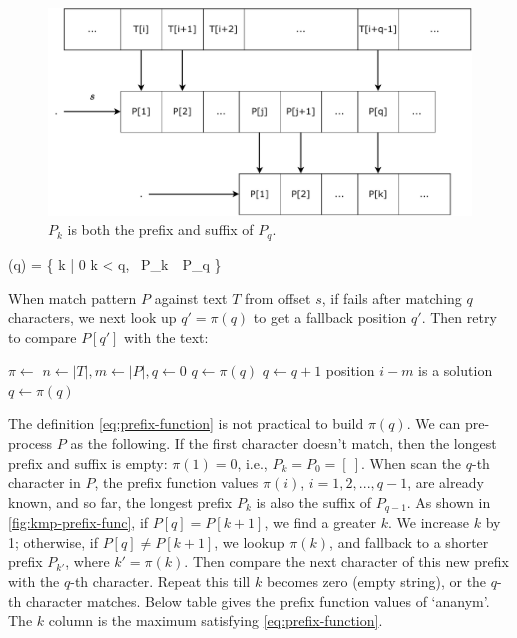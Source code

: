 \documentclass[b5paper]{article}
\begin{document}
\begin{figure}[htbp]
 \centering
 \includegraphics[scale=0.45]{img/kmp-fallback}
 \caption{$P_k$ is both the prefix and suffix of $P_q$.}
 \label{fig:kmp-fallback}
\end{figure}

\be
\pi(q) = \max \{ k | 0 \leq k < q, \ P_k\ \ P_q \}
\label{eq:prefix-function}
\ee

When match pattern $P$ against text $T$ from offset $s$, if fails after matching $q$ characters, we next look up $q' = \pi(q)$ to get a fallback position $q'$. Then retry to compare $P[q']$ with the text:

\begin{algorithmic}[1]
  \State $\pi \gets $ 
  \State $n \gets |T|, m \gets |P|, q \gets 0$
      \State $q \gets \pi(q)$
    \EndWhile
      \State $q \gets q + 1$
    \EndIf
      \State position $i - m$ is a solution
      \State $q \gets \pi(q)$ 
    \EndIf
  \EndFor
\EndFunction
\end{algorithmic}

The definition \cref{eq:prefix-function} is not practical to build $\pi(q)$. We can pre-process $P$ as the following. If the first character doesn't match, then the longest prefix and suffix is empty: $\pi(1) = 0$, i.e., $P_k = P_0 = [\ ]$. When scan the $q$-th character in $P$, the prefix function values $\pi(i)$, $i = 1, 2, ..., q-1$, are already known, and so far, the longest prefix $P_k$ is also the suffix of $P_{q-1}$. As shown in \cref{fig:kmp-prefix-func}, if $P[q] = P[k+1]$, we find a greater $k$. We increase $k$ by 1; otherwise, if $P[q] \neq P[k + 1]$, we lookup $\pi(k)$, and fallback to a shorter prefix $P_{k'}$, where $k' = \pi(k)$. Then compare the next character of this new prefix with the $q$-th character. Repeat this till $k$ becomes zero (empty string), or the $q$-th character matches. Below table gives the prefix function values of `ananym'. The $k$ column is the maximum satisfying \cref{eq:prefix-function}.
\end{document}
